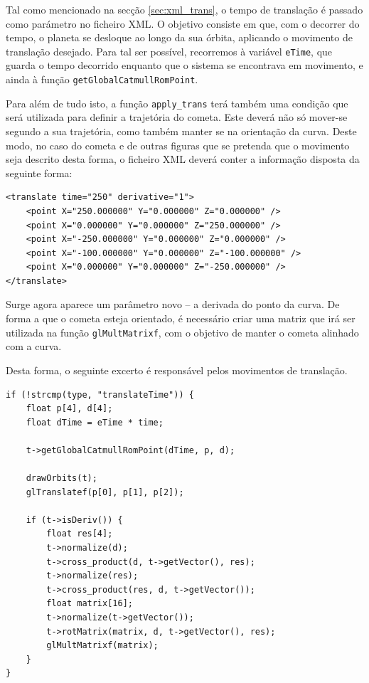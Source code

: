 \documentclass[a4paper, 11pt]{article}
\begin{document}
Tal como mencionado na secção \ref{sec:xml_trans}, o tempo de translação é passado como 
parámetro no ficheiro XML. O objetivo consiste em que, com o decorrer do tempo, o planeta se 
desloque ao longo da sua órbita, aplicando o movimento de translação desejado. Para tal ser 
possível, recorremos à variável \texttt{eTime}, que guarda o tempo decorrido enquanto que o 
sistema se encontrava em movimento, e ainda à função \texttt{getGlobalCatmullRomPoint}.

Para além de tudo isto, a função \texttt{apply\_trans} terá também uma condição que será 
utilizada para definir a trajetória do cometa. Este deverá não só mover-se segundo a sua 
trajetória, como também manter se na orientação da curva. Deste modo, no caso do cometa e de 
outras figuras que se pretenda que o movimento seja descrito desta forma, o ficheiro XML deverá 
conter a informação disposta da seguinte forma:

\pagebreak

\begin{verbatim}
<translate time="250" derivative="1">
    <point X="250.000000" Y="0.000000" Z="0.000000" />
    <point X="0.000000" Y="0.000000" Z="250.000000" />
    <point X="-250.000000" Y="0.000000" Z="0.000000" />
    <point X="-100.000000" Y="0.000000" Z="-100.000000" />
    <point X="0.000000" Y="0.000000" Z="-250.000000" />
</translate>
\end{verbatim}

Surge agora aparece um parâmetro novo -- a derivada do ponto da curva. De forma a que o cometa 
esteja orientado, é necessário criar uma matriz que irá ser utilizada na função 
\texttt{glMultMatrixf}, com o objetivo de manter o cometa alinhado com a curva.

Desta forma, o seguinte excerto é responsável pelos movimentos de translação.

\begin{verbatim}
if (!strcmp(type, "translateTime")) {
    float p[4], d[4];
    float dTime = eTime * time;

    t->getGlobalCatmullRomPoint(dTime, p, d);

    drawOrbits(t);
    glTranslatef(p[0], p[1], p[2]);

    if (t->isDeriv()) {
        float res[4];
        t->normalize(d);
        t->cross_product(d, t->getVector(), res);
        t->normalize(res);
        t->cross_product(res, d, t->getVector());
        float matrix[16];
        t->normalize(t->getVector());
        t->rotMatrix(matrix, d, t->getVector(), res);
        glMultMatrixf(matrix);
    }
}
\end{verbatim}
\end{document}
